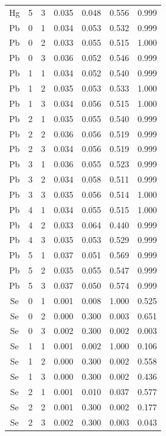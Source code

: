 \documentclass[ms, hidelinks]{uncgdissertationexp}
\theoremstyle{plain}
\theoremstyle{definition}
\theoremstyle{remark}
\begin{document}
\begin{longtable}{ccccccc}
Hg & 5 & 3 & 0.035 & 0.048 & 0.556 & 0.999\\
\rowcolor{gray!6}  Pb & 0 & 1 & 0.034 & 0.053 & 0.532 & 0.999\\
Pb & 0 & 2 & 0.033 & 0.055 & 0.515 & 1.000\\
\rowcolor{gray!6}  Pb & 0 & 3 & 0.036 & 0.052 & 0.546 & 0.999\\
Pb & 1 & 1 & 0.034 & 0.052 & 0.540 & 0.999\\
\rowcolor{gray!6}  Pb & 1 & 2 & 0.035 & 0.053 & 0.533 & 1.000\\
Pb & 1 & 3 & 0.034 & 0.056 & 0.515 & 1.000\\
\rowcolor{gray!6}  Pb & 2 & 1 & 0.035 & 0.055 & 0.540 & 0.999\\
Pb & 2 & 2 & 0.036 & 0.056 & 0.519 & 0.999\\
\rowcolor{gray!6}  Pb & 2 & 3 & 0.034 & 0.056 & 0.519 & 0.999\\
Pb & 3 & 1 & 0.036 & 0.055 & 0.523 & 0.999\\
\rowcolor{gray!6}  Pb & 3 & 2 & 0.034 & 0.058 & 0.511 & 0.999\\
Pb & 3 & 3 & 0.035 & 0.056 & 0.514 & 1.000\\
\rowcolor{gray!6}  Pb & 4 & 1 & 0.034 & 0.055 & 0.515 & 1.000\\
Pb & 4 & 2 & 0.033 & 0.064 & 0.440 & 0.999\\
\rowcolor{gray!6}  Pb & 4 & 3 & 0.035 & 0.053 & 0.529 & 0.999\\
Pb & 5 & 1 & 0.037 & 0.051 & 0.569 & 0.999\\
\rowcolor{gray!6}  Pb & 5 & 2 & 0.035 & 0.055 & 0.547 & 0.999\\
Pb & 5 & 3 & 0.037 & 0.050 & 0.574 & 0.999\\
\rowcolor{gray!6}  Se & 0 & 1 & 0.001 & 0.008 & 1.000 & 0.525\\
Se & 0 & 2 & 0.000 & 0.300 & 0.003 & 0.651\\
\rowcolor{gray!6}  Se & 0 & 3 & 0.002 & 0.300 & 0.002 & 0.003\\
Se & 1 & 1 & 0.001 & 0.002 & 1.000 & 0.106\\
\rowcolor{gray!6}  Se & 1 & 2 & 0.000 & 0.300 & 0.002 & 0.558\\
Se & 1 & 3 & 0.000 & 0.300 & 0.002 & 0.436\\
\rowcolor{gray!6}  Se & 2 & 1 & 0.001 & 0.010 & 0.037 & 0.577\\
Se & 2 & 2 & 0.001 & 0.300 & 0.002 & 0.177\\
\rowcolor{gray!6}  Se & 2 & 3 & 0.002 & 0.300 & 0.003 & 0.043\\

\end{longtable}
\end{document}
